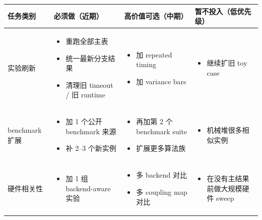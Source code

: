 \documentclass[11pt]{article}
\begin{document}
\begin{longtable}{p{} p{} p{} p{}}
\toprule
\textbf{任务类别} & \textbf{必须做（近期）} & \textbf{高价值可选（中期）} & \textbf{暂不投入（低优先级）} \\
\midrule
\endhead

实验刷新 &
\begin{itemize}
    \item 重跑全部主表
    \item 统一最新分支结果
    \item 清理旧 timeout / 旧 runtime
\end{itemize}
&
\begin{itemize}
    \item 加 repeated timing
    \item 加 variance bars
\end{itemize}
&
\begin{itemize}
    \item 继续扩旧 toy case
\end{itemize}
\\

benchmark 扩展 &
\begin{itemize}
    \item 加 1 个公开 benchmark 来源
    \item 补 2--3 个新实例
\end{itemize}
&
\begin{itemize}
    \item 再加第 2 个 benchmark suite
    \item 扩展更多算法族
\end{itemize}
&
\begin{itemize}
    \item 机械堆很多相似实例
\end{itemize}
\\

硬件相关性 &
\begin{itemize}
    \item 加 1 组 backend-aware 实验
\end{itemize}
&
\begin{itemize}
    \item 多 backend 对比
    \item 多 coupling map 对比
\end{itemize}
&
\begin{itemize}
    \item 在没有主结果前做大规模硬件 sweep
\end{itemize}
\\


\end{longtable}
\end{document}
